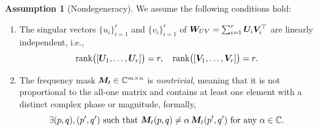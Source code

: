 \documentclass{article}
\theoremstyle{plain}
\theoremstyle{definition}
\newtheorem{assumption}[theorem]{Assumption}
\theoremstyle{remark}
\begin{document}
\begin{assumption}[Nondegeneracy]
\label{assump:nondegeneracy}
We assume the following conditions hold:
\begin{enumerate}%
    \item The singular vectors $\{u_i\}_{i=1}^r$ and $\{v_i\}_{i=1}^r$ of ${\bm{W}}_{UV} = \sum_{i=1}^r {\bm{U}}_i {\bm{V}}_i^\top$ are linearly independent, i.e.,
    \[
        \mathrm{rank}\big([{\bm{U}}_1,\dots,{\bm{U}}_r]\big) = r, \quad 
        \mathrm{rank}\big([{\bm{V}}_1,\dots,{\bm{V}}_r]\big) = r.
    \]
    \item The frequency mask ${\bm{M}}_t \in \mathbb{C}^{m \times n}$ is \emph{nontrivial}, meaning that it is not proportional to the all-one matrix and contains at least one element with a distinct complex phase or magnitude, formally,
    \[
        \exists (p,q),(p',q') \text{ such that } 
        {\bm{M}}_t(p,q) \neq \alpha\, {\bm{M}}_t(p',q') \text{ for any } \alpha \in \mathbb{C}.
    \]
\end{enumerate}
\end{assumption}
\end{document}
